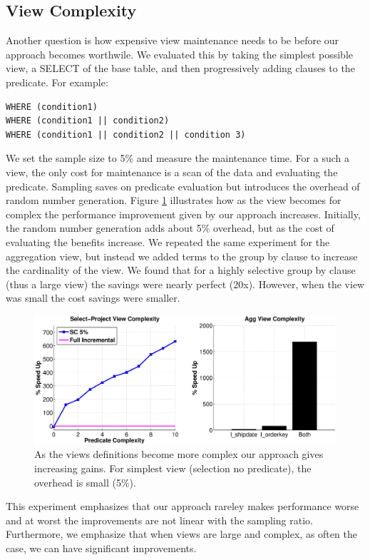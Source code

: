 \subsection{View Complexity}
Another question is how expensive view maintenance needs to be before our approach becomes worthwile.
We evaluated this by taking the simplest possible view, a SELECT of the base table, and then progressively adding clauses to the predicate.
For example:
\begin{lstlisting}
WHERE (condition1)
WHERE (condition1 || condition2)
WHERE (condition1 || condition2 || condition 3)
\end{lstlisting}
We set the sample size to 5\% and measure the maintenance time.
For a such a view, the only cost for maintenance is a scan of the data and evaluating the predicate. 
Sampling saves on predicate evaluation but introduces the overhead of random number generation.
Figure \ref{exp11overheads} illustrates how as the view becomes for complex the performance improvement given
by our approach increases.
Initially, the random number generation adds about 5\% overhead, but as the cost of evaluating the benefits increase.
We repeated the same experiment for the aggregation view, but instead we added terms to the group by clause to increase the
cardinality of the view.
We found that for a highly selective group by clause (thus a large view) the savings were nearly perfect (20x).
However, when the view was small the cost savings were smaller.
\begin{figure}[h]
\label{exp11overheads}
\hspace{-2.5em}
 \includegraphics[scale=0.25]{exp/complexity_efficiency_tradeoff.eps}
 \caption{As the views definitions become more complex our approach gives increasing gains. For simplest view (selection no predicate), the overhead is small (5\%). }
\end{figure}
This experiment emphasizes that our approach rareley makes performance worse and at worst the improvements are not linear with the sampling ratio.
Furthermore, we emphasize that when views are large and complex, as often the case, we can have significant improvements.

